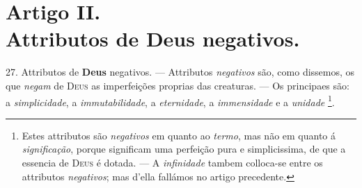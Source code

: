 
\section*{Artigo II.\\ Attributos de Deus negativos.}

 27. Attributos de \textbf{Deus} negativos. --- Attributos \emph{negativos} são, como dissemos, os que \emph{negam} de \textsc{Deus} as imperfeições proprias das creaturas. --- Os principaes são: a \emph{simplicidade}, a \emph{immutabilidade}, a \emph{eternidade}, a \emph{immensidade} e a \emph{unidade} \footnote{Estes attributos são \emph{negativos} em quanto ao \emph{termo}, mas não em quanto á \emph{significação}, porque significam uma perfeição pura e simplicissima, de que a essencia de \textsc{Deus} é dotada. --- A \emph{infinidade} tambem colloca-se entre os attributos \emph{negativos}; mas d'ella fallámos no artigo precedente.}.

